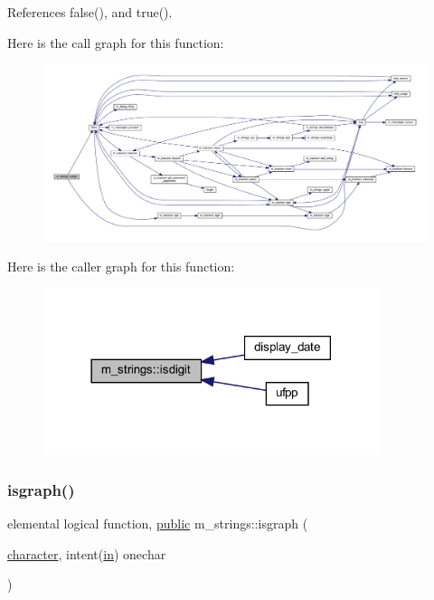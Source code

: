 References false(), and true().

Here is the call graph for this function\+:
\nopagebreak
\begin{figure}[H]
\begin{center}
\leavevmode
\includegraphics[width=350pt]{namespacem__strings_a9f5f98a6c93e21618a16d98a5de2debc_cgraph}
\end{center}
\end{figure}
Here is the caller graph for this function\+:
\nopagebreak
\begin{figure}[H]
\begin{center}
\leavevmode
\includegraphics[width=278pt]{namespacem__strings_a9f5f98a6c93e21618a16d98a5de2debc_icgraph}
\end{center}
\end{figure}
\mbox{\label{namespacem__strings_a84c80fdeeba0679488ed8ad8d37e53c5}} 
\subsubsection{\texorpdfstring{isgraph()}{isgraph()}}
{\footnotesize\ttfamily elemental logical function, \hyperlink{M__stopwatch_83_8txt_a2f74811300c361e53b430611a7d1769f}{public} m\+\_\+strings\+::isgraph (\begin{DoxyParamCaption}\item[{\hyperlink{option__stopwatch_83_8txt_abd4b21fbbd175834027b5224bfe97e66}{character}, intent(\hyperlink{M__journal_83_8txt_afce72651d1eed785a2132bee863b2f38}{in})}]{onechar }\end{DoxyParamCaption})}



